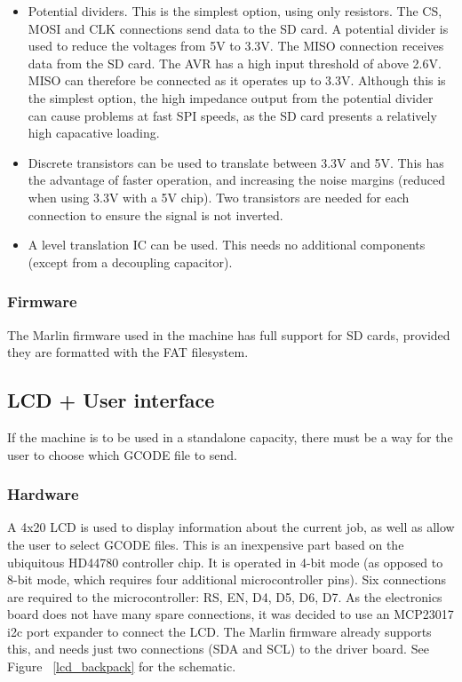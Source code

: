 \documentclass[a4paper,11pt]{article}  %
\begin{document}
\begin{itemize} \itemsep0em
	\item	Potential dividers. This is the simplest option, using only resistors. The CS, MOSI and CLK connections send data to the SD card. A potential divider is used to reduce the voltages
			from 5V to 3.3V. The MISO connection receives data from the SD card. The AVR has a high input threshold of above 2.6V. MISO can therefore be connected as it operates up to 3.3V. 
			Although this is the simplest option, the high impedance output from the potential divider can cause problems at fast SPI speeds, as the SD card presents a relatively high
			capacative loading.
	\item	Discrete transistors can be used to translate between 3.3V and 5V. This has the advantage of faster operation, and increasing the noise margins (reduced when using 3.3V with a 5V chip).
			Two transistors are needed for each connection to ensure the signal is not inverted.
	\item	A level translation IC can be used. This needs no additional components (except from a decoupling capacitor).
\end{itemize}

\subsubsection {Firmware}
The Marlin firmware used in the machine has full support for SD cards, provided they are formatted with the FAT filesystem.

\subsection{LCD + User interface}
If the machine is to be used in a standalone capacity, there must be a way for the user to choose which GCODE file to send.

\subsubsection{Hardware}
A 4x20 LCD is used to display information about the current job, as well as allow the user to select GCODE files. This is an inexpensive part based on the ubiquitous HD44780 controller chip.
It is operated in 4-bit mode (as opposed to 8-bit mode, which requires four additional microcontroller pins). Six connections are required to the microcontroller: RS, EN, D4, D5, D6, D7. As
the electronics board does not have many spare connections, it was decided to use an MCP23017 i2c port expander to connect the LCD. The Marlin firmware already supports this, and needs just
two connections (SDA and SCL) to the driver board. See Figure ~\ref{lcd_backpack} for the schematic.
\end{document}
